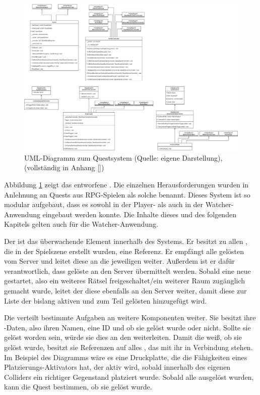\begin{figure}[ht]
\centering
\includegraphics[width=1\linewidth]{content/pictures/QuestSystem.drawio.png}
\caption{UML-Diagramm zum Questsystem (Quelle: eigene Darstellung), (vollständig in Anhang \ref{})}
\label{fig:quest-system-uml}
\end{figure}

Abbildung \ref{fig:quest-system-uml} zeigt das entworfene . Die einzelnen Herausforderungen wurden in Anlehnung an Quests aus \ac{RPG}-Spielen als solche benannt. Dieses System ist so modular aufgebaut, dass es sowohl in der Player- als auch in der Watcher-Anwendung eingebaut werden konnte. Die Inhalte dieses und des folgenden Kapitels gelten auch für die Watcher-Anwendung.

Der  ist das überwachende Element innerhalb des Systems. Er besitzt zu allen , die in der Spielszene erstellt wurden, eine Referenz. Er empfängt alle gelösten  vom Server und leitet diese an die jeweiligen  weiter. Außerdem ist er dafür verantwortlich, dass gelöste  an den Server übermittelt werden. Sobald eine neue  gestartet, also ein weiteres Rätsel freigeschaltet/ein weiterer Raum  zugänglich gemacht wurde, leitet der  diese ebenfalls an den Server weiter, damit diese zur Liste der bislang aktiven und zum Teil gelösten  hinzugefügt wird.

Die  verteilt bestimmte Aufgaben an weitere Komponenten weiter. Sie besitzt ihre -Daten, also ihren Namen, eine ID und ob sie gelöst wurde oder nicht.  Sollte sie gelöst worden sein, würde sie dies an den  weiterleiten. Damit die  weiß, ob sie gelöst wurde, besitzt sie Referenzen auf alles , das mit ihr in Verbindung stehen. Im Beispiel des Diagramms wäre es eine Druckplatte, die die Fähigkeiten eines Platzierungs-Aktivators hat, der aktiv wird, sobald innerhalb des eigenen Colliders ein richtiger Gegenstand platziert wurde. Sobald alle  ausgelöst wurden, kann die Quest bestimmen, ob sie gelöst wurde. 


